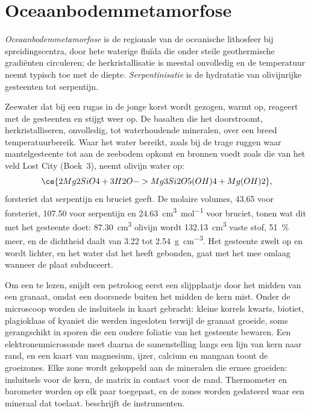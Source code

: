 \section{Oceaanbodemmetamorfose}\label{sec:b2:pt-paths:ocean-floor}

\begin{definition}\label{def:b2:pt-paths:ocean-floor}
\emph{Oceaanbodemmetamorfose} is de regionale
 van de oceanische lithosfeer bij spreidingscentra, door hete waterige fluïda
die onder steile geothermische gradiënten circuleren; de herkristallisatie is meestal onvolledig
en de temperatuur neemt typisch toe met de diepte. \emph{Serpentinisatie}
is de hydratatie van olivijnrijke gesteenten tot serpentijn.
\end{definition}

Zeewater dat bij een rugas in de jonge korst wordt gezogen, warmt op, reageert met de gesteenten en
stijgt weer op. De basalten die het doorstroomt, herkristalliseren, onvolledig, tot waterhoudende
mineralen, over een breed temperatuurbereik. Waar het water  bereikt, zoals bij
de trage ruggen waar mantelgesteente tot aan de zeebodem opkomt en bronnen voedt zoals
die van het veld Lost City (Boek~3), neemt olivijn water op:
\[
\ce{2 Mg2SiO4 + 3 H2O -> Mg3Si2O5(OH)4 + Mg(OH)2},
\]
forsteriet dat serpentijn en bruciet geeft. De molaire volumes, 43.65 voor forsteriet, 107.50
voor serpentijn en \qty{24.63}{cm^3.mol^{-1}} voor bruciet, tonen wat dit met het gesteente doet:
\qty{87.30}{cm^3} olivijn wordt \qty{132.13}{cm^3} vaste stof, \qty{51}{\percent}
meer, en de dichtheid daalt van 3.22 tot \qty{2.54}{g.cm^{-3}}. Het gesteente zwelt op en
wordt lichter, en het water dat het heeft gebonden, gaat met het mee omlaag wanneer de plaat subduceert.

\begin{inthelab}
Om een  te lezen, snijdt een petroloog eerst een slijpplaatje door het midden van een
granaat, omdat een doorsnede buiten het midden de kern mist. Onder de microscoop worden de insluitsels
in kaart gebracht: kleine korrels kwarts, biotiet, plagioklaas of kyaniet die werden ingesloten terwijl de granaat
groeide, soms gerangschikt in sporen die een oudere foliatie van het gesteente bewaren. Een
elektronenmicrosonde meet daarna de samenstelling langs een lijn van kern naar rand, en een kaart van
magnesium, ijzer, calcium en mangaan toont de groeizones. Elke zone wordt gekoppeld aan
de mineralen die ermee groeiden: insluitsels voor de kern, de matrix in contact voor de
rand. Thermometer en barometer worden op elk paar toegepast, en de zones worden gedateerd waar een
mineraal dat toelaat.  beschrijft de instrumenten.
\end{inthelab}

